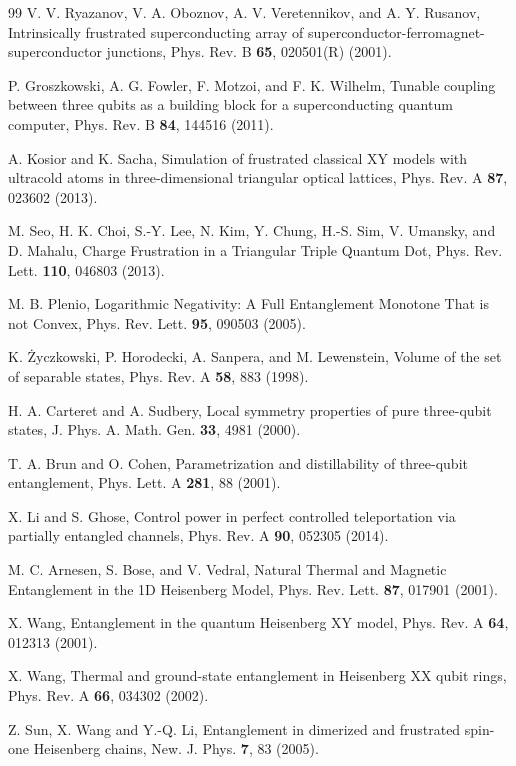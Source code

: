\documentclass[pra,aps,twocolumn,showpacs]{revtex4}
\begin{document}
\begin{thebibliography}{99}
 V. V. Ryazanov, V. A. Oboznov, A. V. Veretennikov, and A. Y. Rusanov, Intrinsically frustrated superconducting array of superconductor-ferromagnet-superconductor junctions, Phys. Rev. B \textbf{65}, 020501(R) (2001).

	P. Groszkowski, A. G. Fowler, F. Motzoi, and F. K. Wilhelm, Tunable coupling between three qubits as a building block for a superconducting quantum computer, Phys. Rev. B \textbf{84}, 144516 (2011).

 A. Kosior and K. Sacha, Simulation of frustrated classical XY models with ultracold atoms in three-dimensional triangular optical lattices, Phys. Rev. A \textbf{87}, 023602 (2013).	

 M. Seo, H. K. Choi, S.-Y. Lee, N. Kim, Y. Chung, H.-S. Sim, V. Umansky, and D. Mahalu, Charge Frustration in a Triangular Triple Quantum Dot, Phys. Rev. Lett. \textbf{110}, 046803 (2013).


 M. B. Plenio, Logarithmic Negativity: A Full Entanglement Monotone That is not Convex, Phys. Rev. Lett. \textbf{95}, 090503 (2005).

 K. \.{Z}yczkowski, P. Horodecki, A. Sanpera, and M. Lewenstein, Volume of the set of separable states, Phys. Rev. A \textbf{58}, 883 (1998).


 H. A. Carteret and A. Sudbery, Local symmetry properties of pure three-qubit states, J. Phys. A. Math. Gen. \textbf{33}, 4981 (2000).

 T. A. Brun and O. Cohen, Parametrization and distillability of three-qubit entanglement, Phys. Lett. A \textbf{281}, 88 (2001).

 X. Li and S. Ghose, Control power in perfect controlled teleportation via partially entangled channels, Phys. Rev. A \textbf{90}, 052305 (2014).


  M. C. Arnesen, S. Bose, and V. Vedral, Natural Thermal and Magnetic Entanglement in the 1D Heisenberg Model, Phys. Rev. Lett. \textbf{87}, 017901 (2001).

 X. Wang, Entanglement in the quantum Heisenberg XY model, Phys. Rev. A \textbf{64}, 012313 (2001).

 X. Wang, Thermal and ground-state entanglement in Heisenberg XX qubit rings, Phys. Rev. A \textbf{66}, 034302 (2002).

 Z. Sun, X. Wang and Y.-Q. Li, Entanglement in dimerized and frustrated spin-one Heisenberg chains, New. J. Phys. \textbf{7}, 83 (2005).


\end{thebibliography}
\end{document}
